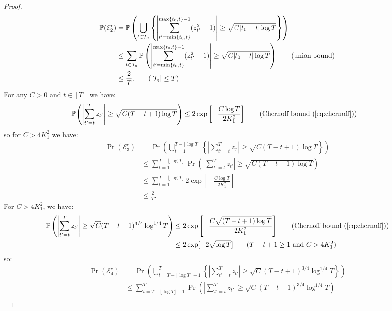 \begin{proof}
\small
\begin{align*}
    \Pr(\mathcal{E}^c_2) &= \Pr\left(\bigcup_{t \in \mathcal{T}_{\kappa}} \left\{\left|\sum_{t'=\min\{t_0,t\}}^{\max\{t_0,t\}-1} (z^2_{t'}-1)\right| \geq \sqrt{
    C|t_0-t|\log T} \right\} \right) \\
    &\leq \sum_{t \in \mathcal{T}_{\kappa}} \Pr\left(\left|\sum_{t'=\min\{t_0,t\}}^{\max\{t_0,t\}-1} (z^2_{t'}-1)\right| \geq \sqrt{C|t_0-t|\log T}\right) \tag{union bound} \\
    &\leq \frac{2}{T}. \tag{$|\mathcal{T}_\kappa| \leq T$}
\end{align*}
\normalsize
For any $C > 0$ and $t\in[T]$ we have:
\begin{align*}
    \Pr\left(\left|\sum_{t'=t}^T z_{t'}\right| \geq \sqrt{C(T-t+1)\log T}\right) &\leq 2\exp\left[-\frac{C\log T}{2K^2_1}\right] \tag{Chernoff bound (\ref{eq:chernoff})} 
\end{align*}
so for $C > 4K_1^2$ we have:
\begin{align*}
    \Pr(\mathcal{E}^c_3) &= \Pr\left(\bigcup_{t = 1}^{ T - \lfloor\log T\rfloor} \left\{\left|\sum_{t'=t}^T z_{t'}\right| \geq \sqrt{C(T-t+1)\log T} \right\} \right) \\
    &\leq \sum_{t = 1}^{ T - \lfloor\log T\rfloor} \Pr\left(\left|\sum_{t'=t}^T z_{t'}\right| \geq \sqrt{C(T-t+1) \log T} \right)\tag{union bound} \\
    &\leq \sum_{t = 1}^{ T - \lfloor\log T\rfloor}  2\exp\left[-\frac{C\log T}{2K_1^2}\right] \\
    &\leq \frac{2}{T}. \tag{$T - \lfloor\log T\rfloor \leq T$ and $C > 4K_1^2$} 
\end{align*}
For $C > 4K_1^2$, we have:
\begin{align*}
    \Pr\left(\left|\sum_{t'=t}^T z_{t'}\right| \geq \sqrt{C}(T-t+1)^{3/4}\log^{1/4} T\right) &\leq 2\exp\left[-\frac{C\sqrt{(T-t+1)\log T}}{2K^2_1}\right] \tag{Chernoff bound (\ref{eq:chernoff})} \\
    &\leq 2 \exp[-2\sqrt{\log  T}] \tag{$T-t+1 \geq 1$ and $C > 4K_1^2$}
\end{align*}
so:
\begin{align*}
    \Pr(\mathcal{E}^c_4) &= \Pr\left(\bigcup_{t = T - \lfloor \log T\rfloor +1}^T \left\{\left|\sum_{t'=t}^T z_{t'}\right| \geq \sqrt{C}(T-t+1)^{3/4}\log^{1/4} T \right\} \right) \\
    &\leq \sum_{t = T - \lfloor \log T\rfloor +1}^T \Pr\left(\left|\sum_{t'=t}^T z_{t'}\right| \geq \sqrt{C}(T-t+1)^{3/4}\log^{1/4} T \right)\tag{union bound} \\

\end{align*}
\end{proof}
